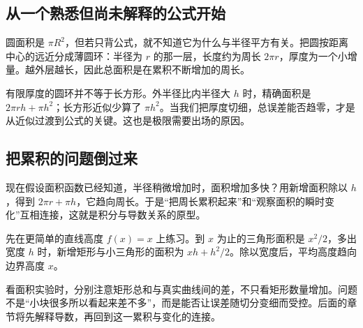 \subsection*{从一个熟悉但尚未解释的公式开始}
圆面积是 $\pi R^2$，但若只背公式，就不知道它为什么与半径平方有关。把圆按距离中心的远近分成薄圆环：半径为 $r$ 的那一层，长度约为周长 $2\pi r$，厚度为一个小增量。越外层越长，因此总面积是在累积不断增加的周长。

有限厚度的圆环并不等于长方形。外半径比内半径大 $h$ 时，精确面积是 $2\pi rh+\pi h^2$；长方形近似少算了 $\pi h^2$。当我们把厚度切细，总误差能否趋零，才是从近似过渡到公式的关键。这也是极限需要出场的原因。

\subsection*{把累积的问题倒过来}
现在假设面积函数已经知道，半径稍微增加时，面积增加多快？用新增面积除以 $h$，得到 $2\pi r+\pi h$，它趋向周长。于是“把周长累积起来”和“观察面积的瞬时变化”互相连接，这就是积分与导数关系的原型。

先在更简单的直线高度 $f(x)=x$ 上练习。到 $x$ 为止的三角形面积是 $x^2/2$，多出宽度 $h$ 时，新增矩形与小三角形的面积为 $xh+h^2/2$。除以宽度后，平均高度趋向边界高度 $x$。

看面积实验时，分别注意矩形总和与真实曲线间的差，不只看矩形数量增加。问题不是“小块很多所以看起来差不多”，而是能否让误差随切分变细而受控。后面的章节将先解释导数，再回到这一累积与变化的连接。
